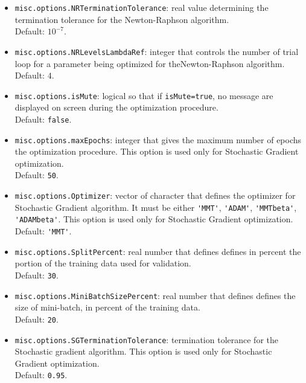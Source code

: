 \begin{itemize}
\begin{itemize}
\item \lstinline[basicstyle = \mlttfamily \small ]!misc.options.NRTerminationTolerance!: real value determining the termination tolerance for the Newton-Raphson algorithm. \\Default: $10^{-7}$.
\item \lstinline[basicstyle = \mlttfamily \small ]!misc.options.NRLevelsLambdaRef!: integer that controls the number of trial loop for a parameter being optimized for theNewton-Raphson algorithm. \\Default: $4$.
\item \lstinline[basicstyle = \mlttfamily \small ]!misc.options.isMute!: logical so that if \lstinline[basicstyle = \mlttfamily \small ]!isMute=true!, no message are displayed on screen during the optimization procedure. \\Default: \lstinline[basicstyle = \mlttfamily \small ]!false!.
\item \lstinline[basicstyle = \mlttfamily \small ]!misc.options.maxEpochs!: integer that gives the maximum number of epochs the optimization procedure. This option is used only for Stochastic Gradient optimization. \\Default: \lstinline[basicstyle = \mlttfamily \small ]!50!.
\item \lstinline[basicstyle = \mlttfamily \small ]!misc.options.Optimizer!: vector of character that defines the optimizer for Stochastic Gradient algorithm. It must be either \lstinline[basicstyle = \mlttfamily \small ]!'MMT'!, \lstinline[basicstyle = \mlttfamily \small ]!'ADAM'!, \lstinline[basicstyle = \mlttfamily \small ]!'MMTbeta'!, \lstinline[basicstyle = \mlttfamily \small ]!'ADAMbeta'!. This option is used only for Stochastic Gradient optimization. \\Default: \lstinline[basicstyle = \mlttfamily \small ]!'MMT'!.
\item \lstinline[basicstyle = \mlttfamily \small ]!misc.options.SplitPercent!: real number that defines defines in percent the portion of the training data used for validation. \\Default: \lstinline[basicstyle = \mlttfamily \small ]!30!.
\item \lstinline[basicstyle = \mlttfamily \small ]!misc.options.MiniBatchSizePercent!: real number that defines defines the size of mini-batch, in percent of the training data. \\Default: \lstinline[basicstyle = \mlttfamily \small ]!20!.
\item \lstinline[basicstyle = \mlttfamily \small ]!misc.options.SGTerminationTolerance!: termination tolerance for the Stochastic gradient algorithm. This option is used only for Stochastic Gradient optimization. \\Default: \lstinline[basicstyle = \mlttfamily \small ]!0.95!.
\end{itemize}


\end{itemize}
